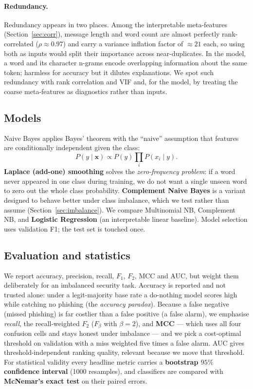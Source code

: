 \documentclass[11pt]{article}
\begin{document}
\paragraph{Redundancy.} Redundancy appears in two places. Among the interpretable
meta-features (Section~\ref{sec:corr}), message length and word count are almost
perfectly rank-correlated ($\rho \approx 0.97$) and carry a variance inflation factor of
$\approx 21$ each, so using both as inputs would split their importance across
near-duplicates. In the model, a word and its character n-grams encode overlapping
information about the same token; harmless for accuracy but it dilutes explanations. We
spot such redundancy with rank correlation and VIF and, for the model, by treating the
coarse meta-features as diagnostics rather than inputs.

\subsection{Models}
\label{sec:models}
Naive Bayes applies Bayes' theorem with the ``naive'' assumption that features are
conditionally independent given the class:
\[
P(y \mid \mathbf{x}) \propto P(y)\prod_i P(x_i \mid y).
\]
\textbf{Laplace (add-one) smoothing} solves the \emph{zero-frequency problem}: if a
word never appeared in one class during training, we do not want a single unseen
word to zero out the whole class probability. \textbf{Complement Naive Bayes}
\citep{rennie2003tackling} is a variant designed to behave better under class
imbalance, which we test rather than assume (Section~\ref{sec:imbalance}). We compare
Multinomial NB, Complement NB, and \textbf{Logistic Regression} (an interpretable
linear baseline). Model selection uses validation F1; the test set is touched once.

\subsection{Evaluation and statistics}
\label{sec:metricdef}
We report accuracy, precision, recall, $F_1$, $F_2$, MCC and AUC, but weight them
deliberately for an imbalanced security task. Accuracy is reported and not trusted alone:
under a legit-majority base rate a do-nothing model scores high while catching no phishing
(the \emph{accuracy paradox}). Because a false negative (missed phishing) is far costlier
than a false positive (a false alarm), we emphasise \emph{recall}, the recall-weighted
$F_2$ ($F_\beta$ with $\beta=2$), and \textbf{MCC} --- which uses all four confusion cells
and stays honest under imbalance \citep{chicco2020advantages} --- and we pick a cost-optimal
threshold on validation with a miss weighted five times a false alarm. AUC gives
threshold-independent ranking quality, relevant because we move that threshold. For
statistical validity every headline metric carries a \textbf{bootstrap $95\%$ confidence
interval} (1000 resamples), and classifiers are compared with \textbf{McNemar's exact test}
on their paired errors.
\end{document}
